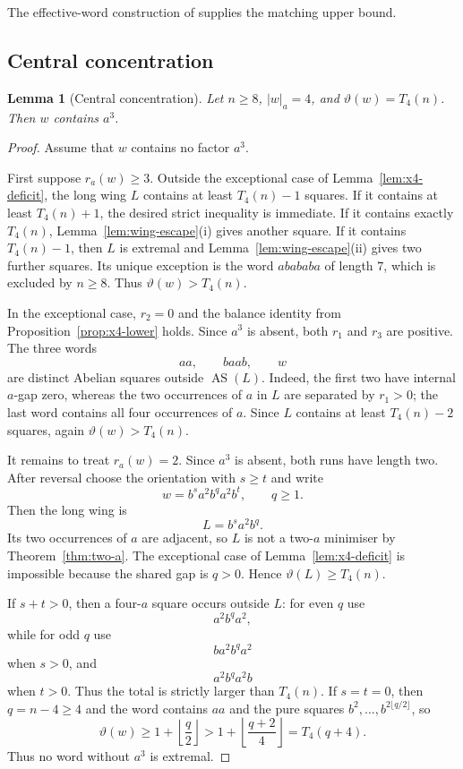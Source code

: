 \documentclass[11pt]{article}
\newtheorem{lemma}[theorem]{Lemma}
\theoremstyle{definition}
\newcommand{\AS}{\operatorname{AS}}
\newcommand{\thetaas}{\vartheta}
\newcommand{\ra}{r_a}
\begin{document}
The effective-word construction of \cite[Theorem~12]{FMMS2026} supplies the matching upper bound.

\subsection{Central concentration}

\begin{lemma}[Central concentration]\label{lem:x4-aaa}
Let $n\ge8$, $|w|_a=4$, and $\thetaas(w)=T_4(n)$. Then $w$ contains $a^3$.
\end{lemma}

\begin{proof}
Assume that $w$ contains no factor $a^3$.

First suppose $\ra(w)\ge3$. Outside the exceptional case of Lemma~\ref{lem:x4-deficit}, the long wing $L$ contains at least $T_4(n)-1$ squares. If it contains at least $T_4(n)+1$, the desired strict inequality is immediate. If it contains exactly $T_4(n)$, Lemma~\ref{lem:wing-escape}(i) gives another square. If it contains $T_4(n)-1$, then $L$ is extremal and Lemma~\ref{lem:wing-escape}(ii) gives two further squares. Its unique exception is the word $abababa$ of length $7$, which is excluded by $n\ge8$. Thus $\thetaas(w)>T_4(n)$.

In the exceptional case, $r_2=0$ and the balance identity from Proposition~\ref{prop:x4-lower} holds. Since $a^3$ is absent, both $r_1$ and $r_3$ are positive. The three words
\[
 aa,\qquad baab,\qquad w
\]
are distinct Abelian squares outside $\AS(L)$. Indeed, the first two have internal $a$-gap zero, whereas the two occurrences of $a$ in $L$ are separated by $r_1>0$; the last word contains all four occurrences of $a$. Since $L$ contains at least $T_4(n)-2$ squares, again $\thetaas(w)>T_4(n)$.

It remains to treat $\ra(w)=2$. Since $a^3$ is absent, both runs have length two. After reversal choose the orientation with $s\ge t$ and write
\[
 w=b^s a^2 b^q a^2 b^t,\qquad q\ge1.
\]
Then the long wing is
\[
 L=b^s a^2 b^q.
\]
Its two occurrences of $a$ are adjacent, so $L$ is not a two-$a$ minimiser by Theorem~\ref{thm:two-a}. The exceptional case of Lemma~\ref{lem:x4-deficit} is impossible because the shared gap is $q>0$. Hence $\thetaas(L)\ge T_4(n)$.

If $s+t>0$, then a four-$a$ square occurs outside $L$: for even $q$ use
\[
 a^2b^q a^2,
\]
while for odd $q$ use
\[
 ba^2b^q a^2
\]
when $s>0$, and
\[
 a^2b^q a^2b
\]
when $t>0$. Thus the total is strictly larger than $T_4(n)$. If $s=t=0$, then $q=n-4\ge4$ and the word contains $aa$ and the pure squares $b^2,\ldots,b^{2\lfloor q/2\rfloor}$, so
\[
 \thetaas(w)\ge1+\left\lfloor\frac q2\right\rfloor
 >1+\left\lfloor\frac{q+2}{4}\right\rfloor=T_4(q+4).
\]
Thus no word without $a^3$ is extremal.
\end{proof}
\end{document}
